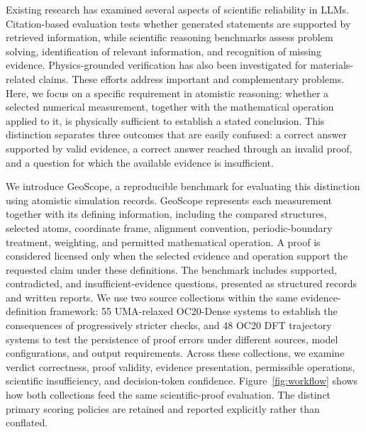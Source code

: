 Existing research has examined several aspects of scientific reliability in LLMs. Citation-based evaluation tests whether generated statements are supported by retrieved information,\cite{gao2023enabling} while scientific reasoning benchmarks assess problem solving, identification of relevant information, and recognition of missing evidence.\cite{wang2024scibench,yu2026scicueval} Physics-grounded verification has also been investigated for materials-related claims.\cite{chen2026phyver} These efforts address important and complementary problems. Here, we focus on a specific requirement in atomistic reasoning: whether a selected numerical measurement, together with the mathematical operation applied to it, is physically sufficient to establish a stated conclusion. This distinction separates three outcomes that are easily confused: a correct answer supported by valid evidence, a correct answer reached through an invalid proof, and a question for which the available evidence is insufficient.

We introduce GeoScope, a reproducible benchmark for evaluating this distinction using atomistic simulation records. GeoScope represents each measurement together with its defining information, including the compared structures, selected atoms, coordinate frame, alignment convention, periodic-boundary treatment, weighting, and permitted mathematical operation. A proof is considered licensed only when the selected evidence and operation support the requested claim under these definitions. The benchmark includes supported, contradicted, and insufficient-evidence questions, presented as structured records and written reports. We use two source collections within the same evidence-definition framework: 55 UMA-relaxed OC20-Dense systems to establish the consequences of progressively stricter checks, and 48 OC20 DFT trajectory systems to test the persistence of proof errors under different sources, model configurations, and output requirements.\cite{wood2025uma,chanussot2021open} Across these collections, we examine verdict correctness, proof validity, evidence presentation, permissible operations, scientific insufficiency, and decision-token confidence. Figure~\ref{fig:workflow} shows how both collections feed the same scientific-proof evaluation. The distinct primary scoring policies are retained and reported explicitly rather than conflated.

